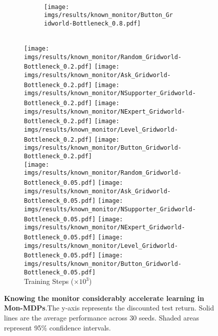 \begin{figure}[!tbh]
\begin{subfigure}{\linewidth}
\begin{subfigure}[b]{0.158\textwidth}
    \end{subfigure} 
    \hfill
    \begin{subfigure}[b]{0.158\textwidth}
        \centering
        \\
        \texttt{[image: imgs/results/known\_monitor/Button\_Gridworld-Bottleneck\_0.8.pdf]}
    \end{subfigure} 
    \\
    \hfill
        \texttt{[image: imgs/results/known\_monitor/Random\_Gridworld-Bottleneck\_0.2.pdf]}
    \hfill
        \texttt{[image: imgs/results/known\_monitor/Ask\_Gridworld-Bottleneck\_0.2.pdf]}
    \hfill
        \texttt{[image: imgs/results/known\_monitor/NSupporter\_Gridworld-Bottleneck\_0.2.pdf]}
    \hfill
        \texttt{[image: imgs/results/known\_monitor/NExpert\_Gridworld-Bottleneck\_0.2.pdf]}
    \hfill
        \texttt{[image: imgs/results/known\_monitor/Level\_Gridworld-Bottleneck\_0.2.pdf]}
    \hfill
        \texttt{[image: imgs/results/known\_monitor/Button\_Gridworld-Bottleneck\_0.2.pdf]}
    \\
    \hfill
        \texttt{[image: imgs/results/known\_monitor/Random\_Gridworld-Bottleneck\_0.05.pdf]}
    \hfill
        \texttt{[image: imgs/results/known\_monitor/Ask\_Gridworld-Bottleneck\_0.05.pdf]}
    \hfill
        \texttt{[image: imgs/results/known\_monitor/NSupporter\_Gridworld-Bottleneck\_0.05.pdf]}
    \hfill
        \texttt{[image: imgs/results/known\_monitor/NExpert\_Gridworld-Bottleneck\_0.05.pdf]}
    \hfill
        \texttt{[image: imgs/results/known\_monitor/Level\_Gridworld-Bottleneck\_0.05.pdf]}
    \hfill
        \texttt{[image: imgs/results/known\_monitor/Button\_Gridworld-Bottleneck\_0.05.pdf]}
    \\
    \centering
    {\scriptsize{Training Steps ($\times 10^3$)}}
    \end{subfigure}
    \caption{\textbf{Knowing the monitor considerably accelerate learning in Mon-MDPs}.The y-axis represents the discounted test return. Solid lines are the average performance across 30 seeds. Shaded areas represent 95\% confidence intervals.}
    \label{fig:results_known_monitor}
\end{figure}
%
%
%